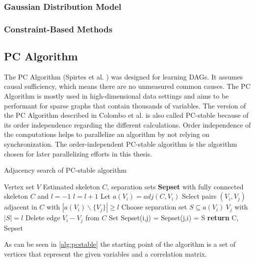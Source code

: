 \subsubsection{Gaussian Distribution Model}


\subsubsection{Constraint-Based Methods}



\subsection{PC Algorithm}
The PC Algorithm (Spirtes et al. \cite{spirtesCausationPredictionSearch1993}) was designed for learning DAGs. It assumes causal sufficiency, which means there are no unmeasured common causes. The PC Algorithm is mostly used in high-dimensional data settings and aims to be performant for sparse graphs that contain thousands of variables. \cite{kalischUnderstandingHumanFunctioning2010}
The version of the PC Algorithm described in Colombo et al. \cite{colomboOrderIndependentConstraintBasedCausal} is also called PC-stable because of its order independence regarding the different calculations. Order independence of the computations helps to parallelize an algorithm by not relying on synchronization. The order-independent PC-stable algorithm is the algorithm chosen for later parallelizing efforts in this thesis.

\begin{algorithm}
    \caption{Adjacency search of PC-stable algorithm \cite{colomboOrderIndependentConstraintBasedCausal}}
    \label{alg:pcstable}
    \begin{algorithmic}[1]
    \Require Vertex set $V$
    \Ensure Estimated skeleton $C$, separation sets \textbf{Sepset}
    \State with fully connected skeleton $C$ and $l = -1$
    \Repeat 
        \State $l=l+1$
            \State Let $a(V_i) = adj(C,V_i)$
        \EndFor
        \Repeat
            \State Select pairs $(V_i,V_j)$ adjacent in $C$ with $|a(V_i)\backslash\{V_j\}| \geq l$
            \Repeat
                \State Choose separation set $S \subseteq a(V_i ) \ {V_j }$ with $| S | = l$
                    \State Delete edge $V_i - V_j$ from $C$
                    \State Set Sepset(i,j) = Sepset(j,i) = S
                \EndIf
    \State \textbf{return} C, Sepset
    \end{algorithmic}
\end{algorithm}

As can be seen in \ref{alg:pcstable} the starting point of the algorithm is a set of vertices that represent the given variables and a correlation matrix.
